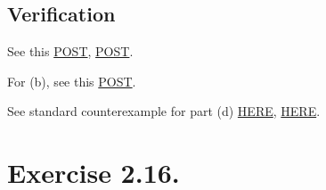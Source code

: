\subsection{Verification}

See this \href{https://math.stackexchange.com/questions/1442665/a-noetherian-topological-space-is-compact}{POST}, \href{https://math.stackexchange.com/questions/2745543/v-is-noetherian-space-if-only-if-every-open-subset-of-v-is-compact}{POST}.

For (b), see this \href{https://math.stackexchange.com/questions/4690764/is-this-space-noetherian}{POST}.

See standard counterexample for part (d) \href{https://math.stackexchange.com/questions/1611732/example-of-non-noetherian-ring-whose-spectrum-is-noetherian/1611757#1611757}{HERE}, \href{https://math.stackexchange.com/questions/7392/a-non-noetherian-ring-with-noetherian-spectrum}{HERE}.


\section{Exercise 2.16.}


